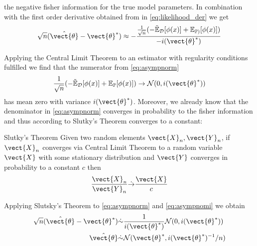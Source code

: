       the negative fisher information for the true model parameters.
      In combination with the first order derivative obtained from in \autoref{eq:likelihood_der} we get 
      \begin{equation}
        \label{eq:asympnorm}
          \begin{split}
            \sqrt{n}(\hat{\vect{\theta}} - \vect{\theta}^*)  &\approx - \frac{\frac{1}{\sqrt{n}}( -\tilde{\mathbb{E}}_{\mathcal{D}}[\phi(x)] + \mathbb{E}_{\mathbb{P})}[\phi(x)])}{- i(\vect{\theta}^*)} \\
          \end{split}
      \end{equation}

      Applying the Central Limit Theorem to an estimator with regularity conditions fulfilled we find  that the numerator from \autoref{eq:asympnorm}
        \begin{equation}
            \label{eq:asympnomi}
            \frac{1}{\sqrt{n}} ( -\tilde{\mathbb{E}}_{\mathcal{D}}[\phi(x)] + \mathbb{E}_{\mathbb{P}}[\phi(x)]) \rightarrow \mathcal{N}(0, i(\vect{\theta}^*))
        \end{equation}
        has mean zero with variance $i(\vect{\theta}^*)$.
        Moreover, we already know that the denominator in \autoref{eq:asympnorm} converges in probability to the fisher information and thus according to Slutky's Theorem converges to a constant:

        \begin{threm}{Slutky's Theorem \cite{casella2002statistical}}
            Given two random elements $\vect{X}_n, \vect{Y}_n$, if $\vect{X}_n$ converges via Central Limit Theorem to a random variable $\vect{X}$ with some stationary distribution and $\vect{Y}$ converges in probability to a constant $c$ then 
            \begin{equation}
                \frac{\vect{X}_n}{\vect{Y}_n} \dot{\rightarrow} \frac{\vect{X}}{c}
            \end{equation}
        \end{threm}

        Applying Slutsky's Theorem to \autoref{eq:asympnorm} and \autoref{eq:asympnomi} we obtain 
        \begin{equation}
            \begin{split}
            \sqrt{n}(\hat{\vect{\theta}} - \vect{\theta}^*)  &\dot{\sim} \frac{1}{ i(\vect{\theta}^*)} \mathcal{N}(0, i(\vect{\theta}^*)) \\
            \hat{\vect{\theta}} &\dot{\sim} \mathcal{N}(\vect{\theta}^*, i(\vect{\theta}^*)^{-1}/n)\\
        \end{split}
        \end{equation}

